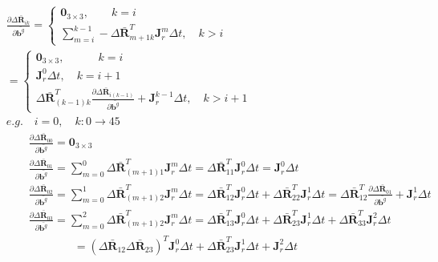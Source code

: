 \documentclass{article}
\begin{document}
\begin{CJK*}{GBK}{song}
\begin{equation}\left.\begin{aligned}&
\frac{\partial{\Delta \bar{\mathbf{R}}_{ik}}}{\partial{\bar{\mathbf{b}^g}}} =
\left\{
\begin{aligned}
\mathbf{0}_{3\times{3}},\qquad k=i
\\
\sum_{m=i}^{k-1}-\Delta \bar{\mathbf{R}}_{m+1k}^{T}\mathbf{J}^{m}_r\Delta{t},\quad k>i
\end{aligned}
\right.
\\&
=
\left\{
\begin{aligned}
\mathbf{0}_{3\times{3}},\qquad \quad k=i
\\
\mathbf{J}^{0}_r\Delta{t},\quad k=i+1
\\
\Delta \bar{\mathbf{R}}_{(k-1)k}^{T}\frac{\partial{\Delta \bar{\mathbf{R}}_{i(k-1)}}}{\partial{\bar{\mathbf{b}^g}}}+\mathbf{J}^{k-1}_r\Delta{t}
,\quad k>i+1
\end{aligned}
\right.
\\&
e.g. \quad i=0, \quad k:0\rightarrow{45}
\\&
\qquad \frac{\partial{\Delta \bar{\mathbf{R}}_{00}}}{\partial{\bar{\mathbf{b}^g}}} = \mathbf{0}_{3\times{3}}
\\&
\qquad \frac{\partial{\Delta \bar{\mathbf{R}}_{01}}}{\partial{\bar{\mathbf{b}^g}}} = \sum_{m=0}^{0}\Delta \bar{\mathbf{R}}_{(m+1)1}^{T}\mathbf{J}^{m}_r\Delta{t}
=\Delta \bar{\mathbf{R}}_{11}^{T}\mathbf{J}^{0}_r\Delta{t}=\mathbf{J}^{0}_r\Delta{t}
\\&
\qquad \frac{\partial{\Delta \bar{\mathbf{R}}_{02}}}{\partial{\bar{\mathbf{b}^g}}} = \sum_{m=0}^{1}\Delta \bar{\mathbf{R}}_{(m+1)2}^{T}\mathbf{J}^{m}_r\Delta{t}
=\Delta \bar{\mathbf{R}}_{12}^{T}\mathbf{J}^{0}_r\Delta{t}
+ \Delta \bar{\mathbf{R}}_{22}^{T}\mathbf{J}^{1}_r\Delta{t}
=\Delta \bar{\mathbf{R}}_{12}^{T}\frac{\partial{\Delta \bar{\mathbf{R}}_{01}}}{\partial{\bar{\mathbf{b}^g}}}+\mathbf{J}^{1}_r\Delta{t}
\\&
\qquad \frac{\partial{\Delta \bar{\mathbf{R}}_{03}}}{\partial{\bar{\mathbf{b}^g}}} = \sum_{m=0}^{2}\Delta \bar{\mathbf{R}}_{(m+1)2}^{T}\mathbf{J}^{m}_r\Delta{t}
=\Delta \bar{\mathbf{R}}_{13}^{T}\mathbf{J}^{0}_r\Delta{t}
+ \Delta \bar{\mathbf{R}}_{23}^{T}\mathbf{J}^{1}_r\Delta{t}
+ \Delta \bar{\mathbf{R}}_{33}^{T}\mathbf{J}^{2}_r\Delta{t}
\\&
\qquad \qquad \qquad =
{(\Delta\bar{\mathbf{R}}_{12}\Delta\bar{\mathbf{R}}_{23})}^{T}\mathbf{J}^{0}_r\Delta{t}
+\Delta \bar{\mathbf{R}}_{23}^{T}\mathbf{J}^{1}_r\Delta{t}+ 
\mathbf{J}^{2}_r\Delta{t}
\\&

\end{aligned}
\end{equation}
\end{CJK*}
\end{document}
